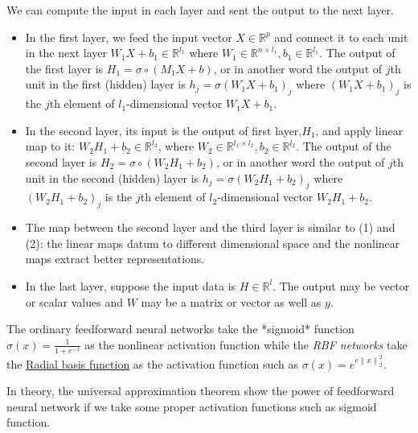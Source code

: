 \documentclass[titlestyle=hang,11pt]{elegantbook}
\begin{document}
\begin{note}
	We can compute the input in each layer and sent the output to the next layer.
	\begin{itemize}
		\item In the first layer, we feed the input vector $X\in\mathbb{R}^{p}$ and connect it to each unit in the next layer $W_1X+b_1\in\mathbb{R}^{l_1}$ 
		      where $W_1\in\mathbb{R}^{n\times l_1}, b_1\in\mathbb{R}^{l_1}$. 
              The output of the first layer is $H_1=\sigma\circ(M_1X+b)$, or in another word the output of $j$th unit in the first (hidden) layer is $h_j=\sigma{(W_1X+b_1)}_j$ 
               where ${(W_1X+b_1)}_j$ is the $j$th element of $l_1$-dimensional vector $W_1X+b_1$.
        \item In the second layer, its input is the output of first layer,$H_1$, and apply linear map to it: $W_2H_1+b_2\in\mathbb{R}^{l_2}$, 
               where $W_2\in\mathbb{R}^{l_1\times l_2}, b_2\in\mathbb{R}^{l_2}$. The output of the second layer is $H_2=\sigma\circ(W_2H_1+b_2)$, 
                or in another word the output of $j$th unit in the second (hidden) layer is $h_j=\sigma{(W_2H_1+b_2)}_j$ where ${(W_2H_1+b_2)}_j$ is the $j$th element of $l_2$-dimensional vector $W_2H_1+b_2$.
		\item The map between the second layer and the third layer is similar to (1) and (2): the linear maps datum to different dimensional space and the nonlinear maps extract better representations.
		\item In the last layer, suppose the input data is $H\in\mathbb{R}^{l}$. The output may be vector or scalar values and $W$ may be a matrix or vector as well as $y$.
	\end{itemize}
\end{note}

\par
The ordinary feedforward neural networks take the *sigmoid* function $\sigma(x)=\frac{1}{1+e^{-x}}$ as the nonlinear activation function
while the \emph{RBF networks} take the \href{https://www.wikiwand.com/en/Radial_basis_function}{Radial basis function} as the activation function such as $\sigma(x)=e^{c{\|x\|}_2^2}$.

In theory, the universal approximation theorem show the power of feedforward neural network
if we take some proper activation functions such as sigmoid function.

\end{document}
